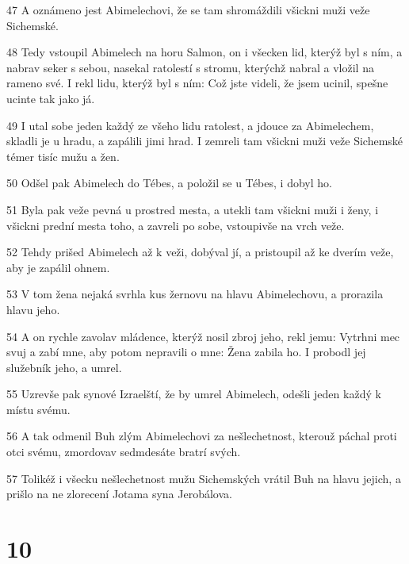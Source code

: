 \par 47 A oznámeno jest Abimelechovi, že se tam shromáždili všickni muži veže Sichemské.
\par 48 Tedy vstoupil Abimelech na horu Salmon, on i všecken lid, kterýž byl s ním, a nabrav seker s sebou, nasekal ratolestí s stromu, kterýchž nabral a vložil na rameno své. I rekl lidu, kterýž byl s ním: Což jste videli, že jsem ucinil, spešne ucinte tak jako já.
\par 49 I utal sobe jeden každý ze všeho lidu ratolest, a jdouce za Abimelechem, skladli je u hradu, a zapálili jimi hrad. I zemreli tam všickni muži veže Sichemské témer tisíc mužu a žen.
\par 50 Odšel pak Abimelech do Tébes, a položil se u Tébes, i dobyl ho.
\par 51 Byla pak veže pevná u prostred mesta, a utekli tam všickni muži i ženy, i všickni prední mesta toho, a zavreli po sobe, vstoupivše na vrch veže.
\par 52 Tehdy prišed Abimelech až k veži, dobýval jí, a pristoupil až ke dverím veže, aby je zapálil ohnem.
\par 53 V tom žena nejaká svrhla kus žernovu na hlavu Abimelechovu, a prorazila hlavu jeho.
\par 54 A on rychle zavolav mládence, kterýž nosil zbroj jeho, rekl jemu: Vytrhni mec svuj a zabí mne, aby potom nepravili o mne: Žena zabila ho. I probodl jej služebník jeho, a umrel.
\par 55 Uzrevše pak synové Izraelští, že by umrel Abimelech, odešli jeden každý k místu svému.
\par 56 A tak odmenil Buh zlým Abimelechovi za nešlechetnost, kterouž páchal proti otci svému, zmordovav sedmdesáte bratrí svých.
\par 57 Tolikéž i všecku nešlechetnost mužu Sichemských vrátil Buh na hlavu jejich, a prišlo na ne zlorecení Jotama syna Jerobálova.

\chapter{10}

